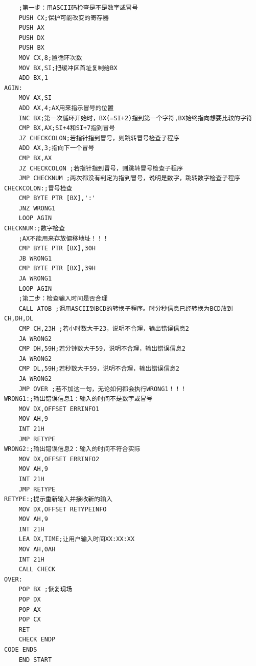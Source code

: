 \documentclass[12pt, a4paper, oneside]{ctexart}
\begin{document}
\begin{lstlisting}
    ;第一步：用ASCII码检查是不是数字或冒号
    PUSH CX;保护可能改变的寄存器
    PUSH AX
    PUSH DX
    PUSH BX
    MOV CX,8;置循环次数
    MOV BX,SI;把缓冲区首址复制给BX
    ADD BX,1
AGIN:
    MOV AX,SI
    ADD AX,4;AX用来指示冒号的位置
    INC BX;第一次循环开始时，BX(=SI+2)指到第一个字符,BX始终指向想要比较的字符
    CMP BX,AX;SI+4和SI+7指到冒号
    JZ CHECKCOLON;若指针指到冒号，则跳转冒号检查子程序
    ADD AX,3;指向下一个冒号
    CMP BX,AX
    JZ CHECKCOLON ;若指针指到冒号，则跳转冒号检查子程序
    JMP CHECKNUM ;两次都没有判定为指到冒号，说明是数字，跳转数字检查子程序
CHECKCOLON:;冒号检查
    CMP BYTE PTR [BX],':'
    JNZ WRONG1
    LOOP AGIN
CHECKNUM:;数字检查
    ;AX不能用来存放偏移地址！！！
    CMP BYTE PTR [BX],30H 
    JB WRONG1 
    CMP BYTE PTR [BX],39H
    JA WRONG1 
    LOOP AGIN 
    ;第二步：检查输入时间是否合理
    CALL ATOB ;调用ASCII到BCD的转换子程序。时分秒信息已经转换为BCD放到CH,DH,DL
    CMP CH,23H ;若小时数大于23，说明不合理，输出错误信息2
    JA WRONG2 
    CMP DH,59H;若分钟数大于59，说明不合理，输出错误信息2
    JA WRONG2 
    CMP DL,59H;若秒数大于59，说明不合理，输出错误信息2
    JA WRONG2 
    JMP OVER ;若不加这一句，无论如何都会执行WRONG1！！！
WRONG1:;输出错误信息1：输入的时间不是数字或冒号
    MOV DX,OFFSET ERRINFO1
    MOV AH,9
    INT 21H
    JMP RETYPE 
WRONG2:;输出错误信息2：输入的时间不符合实际
    MOV DX,OFFSET ERRINFO2
    MOV AH,9
    INT 21H
    JMP RETYPE
RETYPE:;提示重新输入并接收新的输入
    MOV DX,OFFSET RETYPEINFO
    MOV AH,9
    INT 21H
    LEA DX,TIME;让用户输入时间XX:XX:XX
    MOV AH,0AH
    INT 21H
    CALL CHECK
OVER:
    POP BX ;恢复现场
    POP DX
    POP AX
    POP CX 
    RET 
    CHECK ENDP
CODE ENDS
    END START 
\end{lstlisting}
\end{document}
